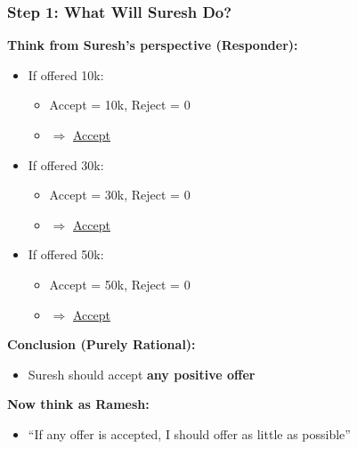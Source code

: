 \begin{frame}[fragile]\frametitle{Step 1: What Will Suresh Do?}

\textbf{Think from Suresh's perspective (Responder):}

\begin{itemize}
  \item If offered 10k:
  \begin{itemize}
    \item Accept = 10k, Reject = 0
    \item $\Rightarrow$ \underline{Accept}
  \end{itemize}
  
  \item If offered 30k:
  \begin{itemize}
    \item Accept = 30k, Reject = 0
    \item $\Rightarrow$ \underline{Accept}
  \end{itemize}
  
  \item If offered 50k:
  \begin{itemize}
    \item Accept = 50k, Reject = 0
    \item $\Rightarrow$ \underline{Accept}
  \end{itemize}
\end{itemize}

\vspace{8pt}

\textbf{Conclusion (Purely Rational):}
\begin{itemize}
  \item Suresh should accept \textbf{any positive offer}
\end{itemize}

\vspace{6pt}

\textbf{Now think as Ramesh:}
\begin{itemize}
  \item “If any offer is accepted, I should offer as little as possible”
\end{itemize}

\end{frame}

